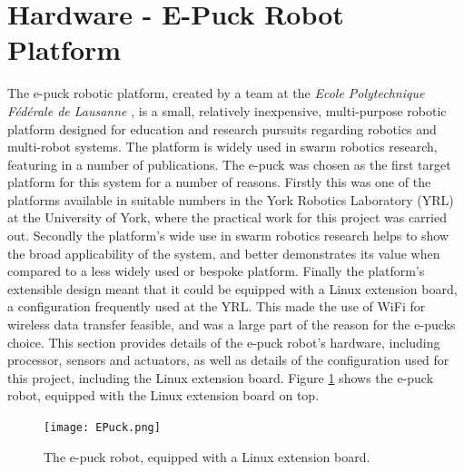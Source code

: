 \section{Hardware - E-Puck Robot Platform}
The e-puck robotic platform, created by a team at the \textit{Ecole Polytechnique Fédérale de Lausanne} \cite{epuck}, is a small, relatively inexpensive, multi-purpose robotic platform designed for education and research pursuits regarding robotics and multi-robot systems. The platform is widely used in swarm robotics research, featuring in a number of publications. The e-puck was chosen as the first target platform for this system for a number of reasons. Firstly this was one of the platforms available in suitable numbers in the York Robotics Laboratory (YRL) at the University of York, where the practical work for this project was carried out. Secondly the platform's wide use in swarm robotics research helps to show the broad applicability of the system, and better demonstrates its value when compared to a less widely used or bespoke platform. Finally the platform's extensible design meant that it could be equipped with a Linux extension board, a configuration frequently used at the YRL. This made the use of WiFi for wireless data transfer feasible, and was a large part of the reason for the e-pucks choice. This section provides details of the e-puck robot's hardware, including processor, sensors and actuators, as well as details of the configuration used for this project, including the Linux extension board. Figure \ref{fig:EPuck} shows the e-puck robot, equipped with the Linux extension board on top.

\begin{figure}
	\begin{center}
	\texttt{[image: EPuck.png]}
	\decoRule
	\caption[The e-puck Robot]{The e-puck robot, equipped with a Linux extension board.}
	\label{fig:EPuck}
	\end{center}
\end{figure}



